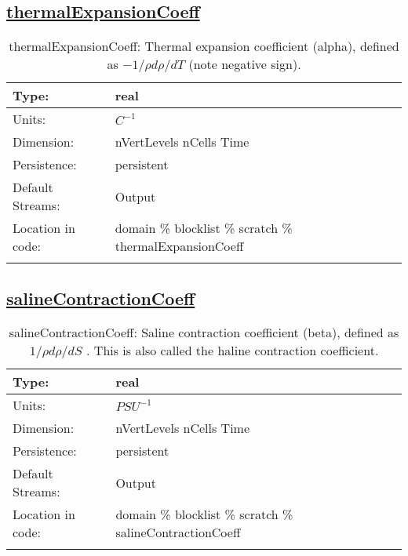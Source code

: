 \subsection[thermalExpansionCoeff]{\hyperref[sec:var_tab_scratch]{thermalExpansionCoeff}}
\label{subsec:var_sec_scratch_thermalExpansionCoeff}
\begin{center}
\begin{longtable}{| p{2.0in} | p{4.0in} |}
        \hline 
        Type: & real \\
        \hline 
        Units: & $C^{-1}$ \\
        \hline 
        Dimension: & nVertLevels nCells Time \\
        \hline 
        Persistence: & persistent \\
        \hline 
		 Default Streams: & Output  \\
        \hline 
		 Location in code: & domain \% blocklist \% scratch \% thermalExpansionCoeff \\
		 \hline 
    \caption{thermalExpansionCoeff:  Thermal expansion coefficient (alpha), defined as  $-1/\rho d\rho/dT$  (note negative sign).}
\end{longtable}
\end{center}
\subsection[salineContractionCoeff]{\hyperref[sec:var_tab_scratch]{salineContractionCoeff}}
\label{subsec:var_sec_scratch_salineContractionCoeff}
\begin{center}
\begin{longtable}{| p{2.0in} | p{4.0in} |}
        \hline 
        Type: & real \\
        \hline 
        Units: & $PSU^{-1}$ \\
        \hline 
        Dimension: & nVertLevels nCells Time \\
        \hline 
        Persistence: & persistent \\
        \hline 
		 Default Streams: & Output  \\
        \hline 
		 Location in code: & domain \% blocklist \% scratch \% salineContractionCoeff \\
		 \hline 
    \caption{salineContractionCoeff:  Saline contraction coefficient (beta), defined as  $1/\rho d\rho/dS$ .  This is also called the haline contraction coefficient.}
\end{longtable}
\end{center}
